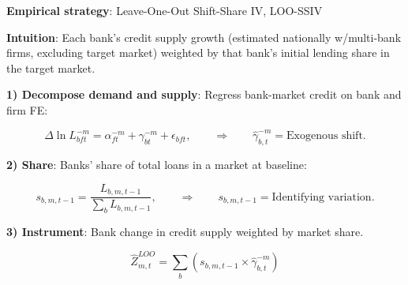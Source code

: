 \documentclass[aspectratio=169]{beamer}
\begin{document}
\begin{frame}{\textbf{Empirical strategy}: Leave-One-Out Shift-Share IV, LOO-SSIV} \label{iv_market_level}

\textbf{Intuition}: Each bank's credit supply growth (estimated nationally w/multi-bank firms, excluding target market) weighted by that bank's initial lending share in the target market.

\vspace{5mm}
\pause

\textbf{1) Decompose demand and supply}: Regress bank-market credit on bank and firm FE:

\begin{equation*}
     \Delta \ln L_{bft}^{-m} = \alpha_{ft}^{-m} + \gamma_{bt}^{-m} + \epsilon_{bft}, \quad \quad \Rightarrow \quad \quad \hat{\gamma}_{b,t}^{-m} = \text{Exogenous shift.} 
\end{equation*}
\pause

\textbf{2) Share}: Banks' share of total loans in a market at baseline:

\begin{equation*}
    s_{b,m,t-1} = \frac{L_{b,m,t-1}}{\sum_b L_{b,m,t-1}}, \quad \quad \Rightarrow \quad \quad s_{b,m,t-1} = \text{Identifying variation.} 
\end{equation*}
\pause

\textbf{3) Instrument}: Bank change in credit supply weighted by market share.  

\begin{equation*}
    \hat{Z}_{m,t}^{LOO} = \sum_b \left( s_{b,m,t-1} \times \hat{\gamma}_{b,t}^{-m} \right) 
\end{equation*}


\end{frame}

\end{document}
